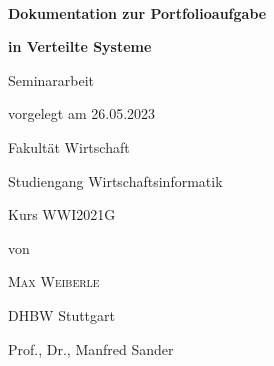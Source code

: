 \newcommand{\typMeinerArbeit}{Seminararbeit}

\newcommand{\themaMeinerArbeit}{Dokumentation zur Portfolioaufgabe in Verteile Systeme}

\newcommand{\meinName}{Max Weiberle}

\thispagestyle{empty}

\begin{spacing}{1}
  \begin{center}
    ~\vspace{0mm}

    {\sffamily
      \LARGE
      \textbf{Dokumentation zur Portfolioaufgabe}

      \bigskip
      \textbf{in Verteilte Systeme}
    }

    \vspace{15mm}

    {\Large \typMeinerArbeit}

    \vspace{1cm}

    vorgelegt am 26.05.2023

    \vspace{15mm}

    Fakultät Wirtschaft
    \medskip

    Studiengang Wirtschaftsinformatik
    \medskip

    Kurs WWI2021G

    \vspace{10mm}

    von

    \vspace{10mm}

    {\large\textsc{\meinName}}

    \vspace{10mm}
  \end{center}

  \vfill

  \begin{center}
    DHBW Stuttgart

    Prof., Dr., Manfred Sander
  \end{center}

  \vspace{1cm}
\end{spacing}

